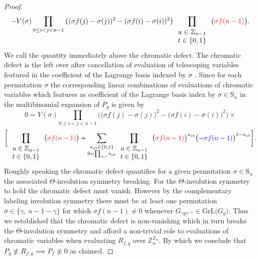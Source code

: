 \begin{proof}
 \[
 -V(\sigma)\prod_{0\le i<j<n-1}\big((\sigma f(j)-\sigma(j))^{2}-(\sigma f(i)-\sigma(i))^{2}\big)\prod_{\begin{array}{c}
u\in\mathbb{Z}_{n-1}\\
t\in\{0,1\}
\end{array}}\big({\color{red}\sigma f(n-1)}\big).
 \]
 We call the quantity immediately above the chromatic defect. The chromatic defect is the left over after cancellation of evaluation of telescoping variables featured in the coefficient of the Lagrange basis indexed by $\sigma$ . Since for each permutation $\sigma$ the corresponding linear combinations of evaluations of chromatic variables which features as coefficient of the Lagrange basis index by $\sigma\in\text{S}_{n}$ in the multibinomial expansion of $\overline{P}_g$ is given by
 \[
 0=V(\sigma)\prod_{0\le i<j<n-1}\bigg(\big(\sigma f(j)-\sigma(j)\big)^{2}-\big(\sigma f(i)-\sigma(i)\big)^{2}\bigg)\times
 \]
 \[
 \bigg[\prod_{\begin{array}{c}
u\in\mathbb{Z}_{n-1}\\
t\in\{0,1\}
\end{array}}\big({\color{red}\sigma f(n-1)}\big)+\sum_{\substack{s_{ut}\in\{0,1\}\\
0=\prod_{u,t}s_{ut}
}
}\prod_{\begin{array}{c}
u\in\mathbb{Z}_{n-1}\\
t\in\{0,1\}
\end{array}}\big({\color{red}\sigma f(n-1)}\big)^{s_{ut}}\big({\color{blue}-\sigma f(n-1)}\big)^{1-s_{ut}}\bigg].
 \]
 Roughly speaking the chromatic defect quantifies for a given permutation $\sigma\in\text{S}_{n}$ the associated $\Theta$-involution symmetry breaking. For the $\Theta$-involution symmetry to hold the chromatic defect must vanish. However by the complementary labeling involution symmetry there must be at least one permutation $\sigma\in\{\gamma,\,n-1-\gamma\}$ for which $\sigma f(n-1)\ne0$ whenever $G_{\gamma g\gamma^{-1}}\in\text{GrL}\big(G_{g}\big)$. Thus we established that the chromatic defect is non-vanishing which in turn breaks the $\Theta$-involution symmetry and afford a non-trivial role to evaluations of chromatic variables when evaluating $R_{f,g}$ over $\mathbb{Z}_{n}^{\mathbb{Z}_{n}}$. By which we conclude that $P_{g}\not\equiv R_{f,g}\implies P_{f}\not\equiv0$ as claimed.
\end{proof}

